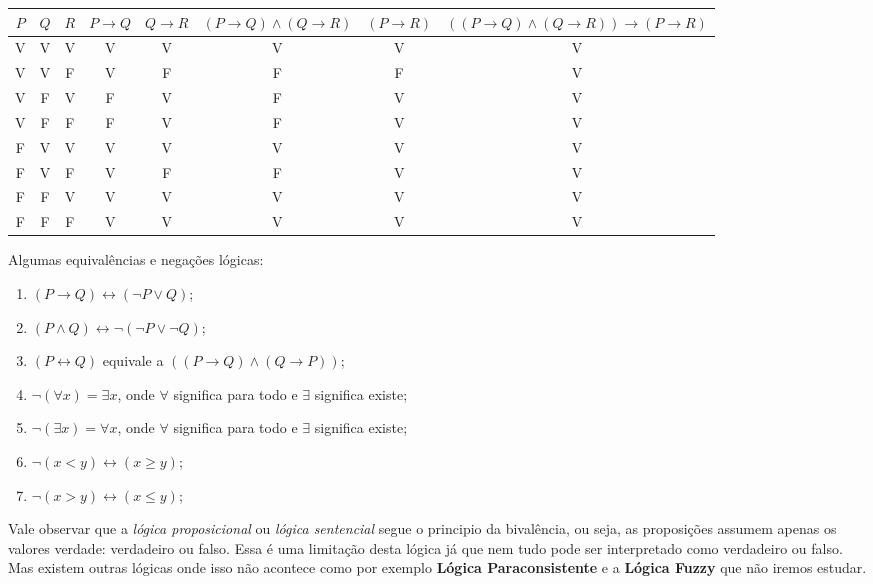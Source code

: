  \vskip0.3cm
 
 \begin{table}[H]
 \centering
 \begin{tabular}{|c|c|c|c|c|c|c|c|} \hline
 \rowcolor{cinza}
 $P$ & $Q$ & $R$ & $P \rightarrow Q$ & $Q \rightarrow R$ & $(P \rightarrow Q) \land (Q \rightarrow R)$ & $(P \rightarrow R)$ & $((P \rightarrow Q) \land (Q \rightarrow R)) \rightarrow (P \rightarrow R)$\\ \hline
 V & V & V & V & V & V & V & V \\ \hline
 V & V & F & V & F & F & F & V \\ \hline
 V & F & V & F & V & F & V & V \\ \hline
 V & F & F & F & V & F & V & V \\ \hline
 F & V & V & V & V & V & V & V \\ \hline
 F & V & F & V & F & F & V & V \\ \hline
 F & F & V & V & V & V & V & V \\ \hline
 F & F & F & V & V & V & V & V \\ \hline
 \end{tabular}
 \end{table}
 
 Algumas equivalências e negações lógicas:
 \begin{enumerate}
  \item $(P \rightarrow Q) \leftrightarrow (\neg P \lor Q)$;
  \item $(P \land Q) \leftrightarrow \neg(\neg P \lor \neg Q)$;
  \item $(P \leftrightarrow Q)$ equivale a $((P \rightarrow Q) \land (Q \rightarrow P))$;
  \item $\neg (\forall x)= \exists x$, onde $\forall$ significa para todo e $\exists$ significa existe;
  \item $\neg (\exists x)= \forall x$, onde $\forall$ significa para todo e $\exists$ significa existe;
  \item $\neg (x < y) \leftrightarrow (x \geq y)$;
  \item $\neg (x > y) \leftrightarrow (x \leq y)$;
 \end{enumerate}
 

 Vale observar que a \emph{lógica proposicional} ou \emph{lógica sentencial} segue o principio da bivalência, ou seja, as proposições assumem apenas os valores verdade: verdadeiro ou falso. Essa é uma limitação desta lógica já que nem tudo pode ser interpretado como verdadeiro ou falso. Mas existem outras lógicas onde isso não acontece como por exemplo \textbf{Lógica Paraconsistente} e a \textbf{Lógica Fuzzy} que não iremos estudar.


 


